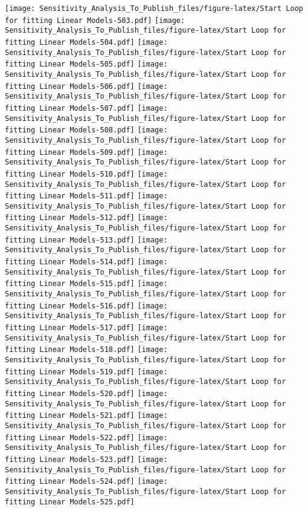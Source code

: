 \documentclass[
]{article}
\begin{document}
\texttt{[image: Sensitivity\_Analysis\_To\_Publish\_files/figure-latex/Start Loop for fitting Linear Models-503.pdf]}
\texttt{[image: Sensitivity\_Analysis\_To\_Publish\_files/figure-latex/Start Loop for fitting Linear Models-504.pdf]}
\texttt{[image: Sensitivity\_Analysis\_To\_Publish\_files/figure-latex/Start Loop for fitting Linear Models-505.pdf]}
\texttt{[image: Sensitivity\_Analysis\_To\_Publish\_files/figure-latex/Start Loop for fitting Linear Models-506.pdf]}
\texttt{[image: Sensitivity\_Analysis\_To\_Publish\_files/figure-latex/Start Loop for fitting Linear Models-507.pdf]}
\texttt{[image: Sensitivity\_Analysis\_To\_Publish\_files/figure-latex/Start Loop for fitting Linear Models-508.pdf]}
\texttt{[image: Sensitivity\_Analysis\_To\_Publish\_files/figure-latex/Start Loop for fitting Linear Models-509.pdf]}
\texttt{[image: Sensitivity\_Analysis\_To\_Publish\_files/figure-latex/Start Loop for fitting Linear Models-510.pdf]}
\texttt{[image: Sensitivity\_Analysis\_To\_Publish\_files/figure-latex/Start Loop for fitting Linear Models-511.pdf]}
\texttt{[image: Sensitivity\_Analysis\_To\_Publish\_files/figure-latex/Start Loop for fitting Linear Models-512.pdf]}
\texttt{[image: Sensitivity\_Analysis\_To\_Publish\_files/figure-latex/Start Loop for fitting Linear Models-513.pdf]}
\texttt{[image: Sensitivity\_Analysis\_To\_Publish\_files/figure-latex/Start Loop for fitting Linear Models-514.pdf]}
\texttt{[image: Sensitivity\_Analysis\_To\_Publish\_files/figure-latex/Start Loop for fitting Linear Models-515.pdf]}
\texttt{[image: Sensitivity\_Analysis\_To\_Publish\_files/figure-latex/Start Loop for fitting Linear Models-516.pdf]}
\texttt{[image: Sensitivity\_Analysis\_To\_Publish\_files/figure-latex/Start Loop for fitting Linear Models-517.pdf]}
\texttt{[image: Sensitivity\_Analysis\_To\_Publish\_files/figure-latex/Start Loop for fitting Linear Models-518.pdf]}
\texttt{[image: Sensitivity\_Analysis\_To\_Publish\_files/figure-latex/Start Loop for fitting Linear Models-519.pdf]}
\texttt{[image: Sensitivity\_Analysis\_To\_Publish\_files/figure-latex/Start Loop for fitting Linear Models-520.pdf]}
\texttt{[image: Sensitivity\_Analysis\_To\_Publish\_files/figure-latex/Start Loop for fitting Linear Models-521.pdf]}
\texttt{[image: Sensitivity\_Analysis\_To\_Publish\_files/figure-latex/Start Loop for fitting Linear Models-522.pdf]}
\texttt{[image: Sensitivity\_Analysis\_To\_Publish\_files/figure-latex/Start Loop for fitting Linear Models-523.pdf]}
\texttt{[image: Sensitivity\_Analysis\_To\_Publish\_files/figure-latex/Start Loop for fitting Linear Models-524.pdf]}
\texttt{[image: Sensitivity\_Analysis\_To\_Publish\_files/figure-latex/Start Loop for fitting Linear Models-525.pdf]}
\end{document}
